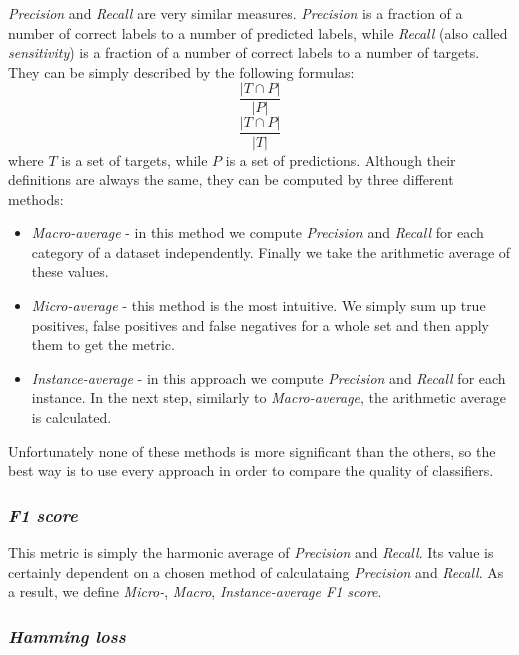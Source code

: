 \textit{Precision} and \textit{Recall} are very similar measures. \textit{Precision} is a fraction of a number of correct labels to a number of predicted labels, while \textit{Recall} (also called \textit{sensitivity}) is a fraction of a number of correct labels to a number of targets. They can be simply described by the following formulas:  
\begin{equation}
\label{eq:exp2}
\frac{|T \cap P|}{|P|}
\end{equation}
\begin{equation}
\label{eq:exp3}
\frac{|T \cap P|}{|T|}
\end{equation}
where $T$ is a set of targets, while $P$ is a set of predictions. Although their definitions are always the same, they can be computed by three different methods:
\begin{itemize}
\item \textit{Macro-average} - in this method we compute \textit{Precision} and \textit{Recall} for each category of a dataset independently. Finally we take the arithmetic average of these values.
\item \textit{Micro-average} - this method is the most intuitive. We simply sum up true positives, false positives and false negatives for a whole set and then apply them to get the metric. 
\item \textit{Instance-average} - in this approach we compute \textit{Precision} and \textit{Recall} for each instance. In the next step, similarly to \textit{Macro-average}, the arithmetic average is calculated.
\end{itemize}

Unfortunately none of these methods is more significant than the others, so the best way is to use every approach in order to compare the quality of classifiers.  

\subsubsection{\textit{F1 score}}

This metric is simply the harmonic average of \textit{Precision} and \textit{Recall}. Its value is certainly dependent on a chosen method of calculataing \textit{Precision} and \textit{Recall}. As a result, we define \textit{Micro-}, \textit{Macro}, \textit{Instance-average F1 score}. 

\subsubsection{\textit{Hamming loss}}

